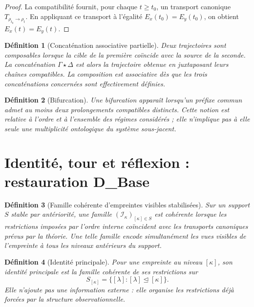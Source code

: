 \documentclass[11pt,a4paper,openany]{book}
\newtheorem{definition}{Définition}[chapter]
\begin{document}
\begin{proof}
La compatibilité fournit, pour chaque \(t\ge t_0\), un transport canonique \(T_{\rho_{t_0}\to\rho_t}\). En appliquant ce transport à l'égalité \(E_x(t_0)=E_y(t_0)\), on obtient \(E_x(t)=E_y(t)\).
\end{proof}

\begin{definition}[Concaténation associative partielle]
Deux trajectoires sont composables lorsque la cible de la première coïncide avec la source de la seconde. La concaténation \(\Gamma\star\Delta\) est alors la trajectoire obtenue en juxtaposant leurs chaînes compatibles. La composition est associative dès que les trois concaténations concernées sont effectivement définies.
\end{definition}

\begin{definition}[Bifurcation]
Une bifurcation apparaît lorsqu'un préfixe commun admet au moins deux prolongements compatibles distincts. Cette notion est relative à l'ordre et à l'ensemble des régimes considérés ; elle n'implique pas à elle seule une multiplicité ontologique du système sous-jacent.
\end{definition}

\section{Identité, tour et réflexion : restauration D\_Base}

\begin{definition}[Famille cohérente d'empreintes visibles stabilisées]
Sur un support \(S\) stable par antériorité, une famille \((\mathcal I_\kappa)_{[\kappa]\in S}\) est cohérente lorsque les restrictions imposées par l'ordre interne coïncident avec les transports canoniques prévus par la théorie. Une telle famille encode simultanément les vues visibles de l'empreinte à tous les niveaux antérieurs du support.
\end{definition}

\begin{definition}[Identité principale]
Pour une empreinte au niveau \([\kappa]\), son identité principale est la famille cohérente de ses restrictions sur
\[
S_{[\kappa]}=\{[\lambda]:[\lambda]\trianglelefteq[\kappa]\}.
\]
Elle n'ajoute pas une information externe : elle organise les restrictions déjà forcées par la structure observationnelle.
\end{definition}
\end{document}
